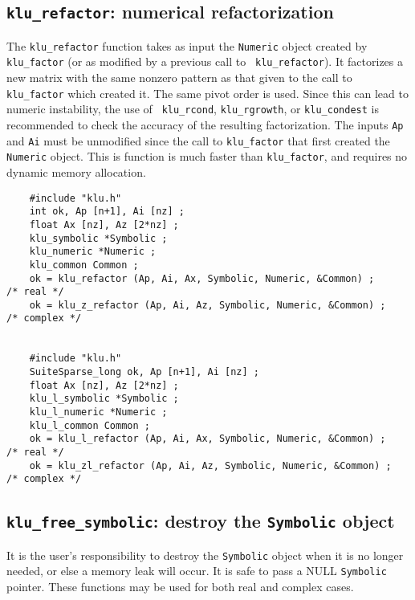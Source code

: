 \documentclass[11pt]{article}
\begin{document}
\subsection{{\tt klu\_refactor}: numerical refactorization}

The {\tt klu\_refactor} function takes as input the {\tt Numeric} object
created by {\tt klu\_factor} (or as modified by a previous call to {\tt
klu\_refactor}).  It factorizes a new matrix with the same nonzero pattern as
that given to the call to {\tt klu\_factor} which created it.  The same pivot
order is used.  Since this can lead to numeric instability, the use of {\tt
klu\_rcond}, {\tt klu\_rgrowth}, or {\tt klu\_condest} is recommended to check
the accuracy of the resulting factorization.  The inputs {\tt Ap} and {\tt Ai}
must be unmodified since the call to {\tt klu\_factor} that first created the
{\tt Numeric} object.  This is function is much faster than {\tt klu\_factor},
and requires no dynamic memory allocation.

{\footnotesize
\begin{verbatim}
    #include "klu.h"
    int ok, Ap [n+1], Ai [nz] ;
    float Ax [nz], Az [2*nz] ;
    klu_symbolic *Symbolic ;
    klu_numeric *Numeric ;
    klu_common Common ;
    ok = klu_refactor (Ap, Ai, Ax, Symbolic, Numeric, &Common) ;                      /* real */
    ok = klu_z_refactor (Ap, Ai, Az, Symbolic, Numeric, &Common) ;                    /* complex */


    #include "klu.h"
    SuiteSparse_long ok, Ap [n+1], Ai [nz] ;
    float Ax [nz], Az [2*nz] ;
    klu_l_symbolic *Symbolic ;
    klu_l_numeric *Numeric ;
    klu_l_common Common ;
    ok = klu_l_refactor (Ap, Ai, Ax, Symbolic, Numeric, &Common) ;                    /* real */
    ok = klu_zl_refactor (Ap, Ai, Az, Symbolic, Numeric, &Common) ;                   /* complex */
\end{verbatim}
}

\subsection{{\tt klu\_free\_symbolic}: destroy the {\tt Symbolic} object}

It is the user's responsibility to destroy the {\tt Symbolic} object when it is
no longer needed, or else a memory leak will occur.  It is safe to pass a NULL
{\tt Symbolic} pointer.  These functions may be used for both real and complex
cases.
\end{document}
